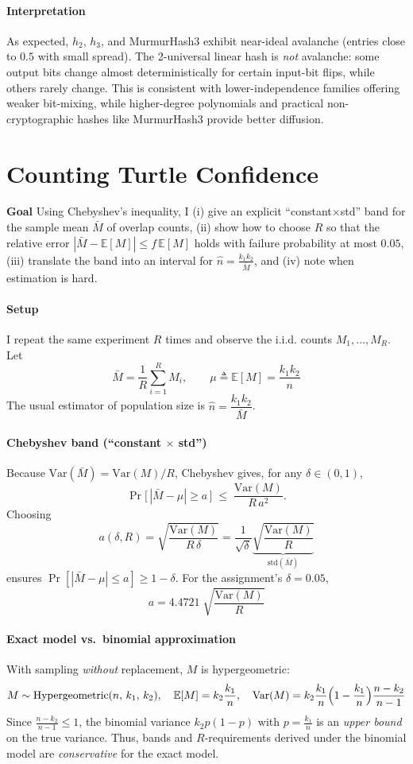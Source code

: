 \documentclass[11pt]{article}
\begin{document}
\paragraph{Interpretation}
As expected, \(h_2\), \(h_3\), and MurmurHash3 exhibit near-ideal avalanche (entries close to \(0.5\) with small spread). The 2-universal linear hash is \emph{not} avalanche: some output bits change almost deterministically for certain input-bit flips, while others rarely change. This is consistent with lower-independence families offering weaker bit-mixing, while higher-degree polynomials and practical non-cryptographic hashes like MurmurHash3 provide better diffusion.

\newpage
\section{Counting Turtle Confidence}
\textbf{Goal} Using Chebyshev’s inequality, I (i) give an explicit “constant$\times$std” band for the sample mean $\bar M$ of overlap counts, (ii) show how to choose $R$ so that the relative error $|\bar M-\mathbb{E}[M]|\le f\,\mathbb{E}[M]$ holds with failure probability at most $0.05$, (iii) translate the band into an interval for $\hat n=\frac{k_1k_2}{\bar M}$, and (iv) note when estimation is hard.

\paragraph{Setup} I repeat the same experiment $R$ times and observe the i.i.d. counts $M_1,\dots,M_R$. Let
\[
\bar M=\frac{1}{R}\sum_{i=1}^R M_i,
\qquad
\mu\triangleq \mathbb{E}[M]=\frac{k_1k_2}{n}
\]
The usual estimator of population size is $\hat n=\dfrac{k_1k_2}{\bar M}$.

\paragraph{Chebyshev band (“constant $\times$ std”)}
Because $\mathrm{Var}(\bar M)=\mathrm{Var}(M)/R$, Chebyshev gives, for any $\delta\in(0,1)$,
\[
\Pr\!\big[\,|\bar M-\mu|\ge a\,\big]\;\le\; \frac{\mathrm{Var}(M)}{R\,a^2}.
\]
Choosing
\[
\,a(\delta,R)=\sqrt{\frac{\mathrm{Var}(M)}{R\,\delta}}
=\frac{1}{\sqrt{\delta}}\underbrace{\sqrt{\frac{\mathrm{Var}(M)}{R}}}_{\mathrm{std}(\bar M)}\,
\]
ensures $\Pr[|\bar M-\mu|\le a]\ge 1-\delta$. For the assignment’s $\delta=0.05$,
\[
\,a=4.4721\;\sqrt{\frac{\mathrm{Var}(M)}{R}}\,
\]

\paragraph{Exact model vs.\ binomial approximation}
With sampling \emph{without} replacement, $M$ is hypergeometric:
\[
M\sim \mathrm{Hypergeometric}(n,\,k_1,\,k_2),\quad
\mathbb{E}[M]=k_2\frac{k_1}{n},\quad
\mathrm{Var}(M)=k_2\frac{k_1}{n}\Bigl(1-\frac{k_1}{n}\Bigr)\frac{n-k_2}{n-1}
\]
Since $\frac{n-k_2}{n-1}\le 1$, the binomial variance $k_2p(1-p)$ with $p=\frac{k_1}{n}$ is an \emph{upper bound} on the true variance. Thus, bands and $R$-requirements derived under the binomial model are \emph{conservative} for the exact model.
\end{document}
